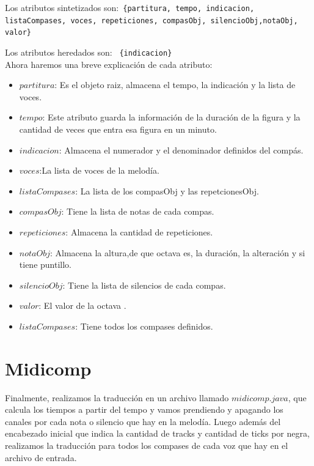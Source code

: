 \documentclass[a4paper]{article}
\begin{document}
Los atributos sintetizados son:\texttt{
\{partitura, tempo, indicacion, listaCompases, voces, repeticiones, compasObj, silencioObj,notaObj, valor\}
}\linebreak


Los atributos heredados son: 
\texttt{
\{indicacion\}
}\\  

Ahora haremos una breve explicación de cada atributo:

\begin{itemize}
\item $partitura$: Es el objeto raiz, almacena el tempo, la indicación y la lista de voces. 
\item $tempo$: Este atributo guarda la información de la duración de la figura y la cantidad de veces que entra esa figura en un minuto.
\item $indicacion$: Almacena el numerador y el denominador definidos del compás.
\item $voces$:La lista de voces de la melodía.
\item $listaCompases$: La lista de los compasObj y las repetcionesObj.
\item $compasObj$: Tiene la lista de notas  de cada compas.
\item $repeticiones$: Almacena la cantidad de repeticiones.
\item $notaObj$: Almacena la altura,de que octava es, la duración, la alteración y si tiene puntillo.
\item $silencioObj$: Tiene la lista de silencios de cada compas.
\item $valor$: El valor de la octava .
\item $listaCompases$: Tiene todos los compases definidos.

\end{itemize}

\newpage

\section{Midicomp}

Finalmente, realizamos la traducción en un archivo llamado $midicomp.java$, que calcula los tiempos a partir del tempo y vamos 
prendiendo y apagando los canales por cada nota o silencio que hay en la melodía.
Luego además del encabezado inicial que indica la cantidad de tracks y cantidad de ticks por negra, realizamos la traducción para todos los compases
de cada voz que hay en el archivo de entrada.
\end{document}
